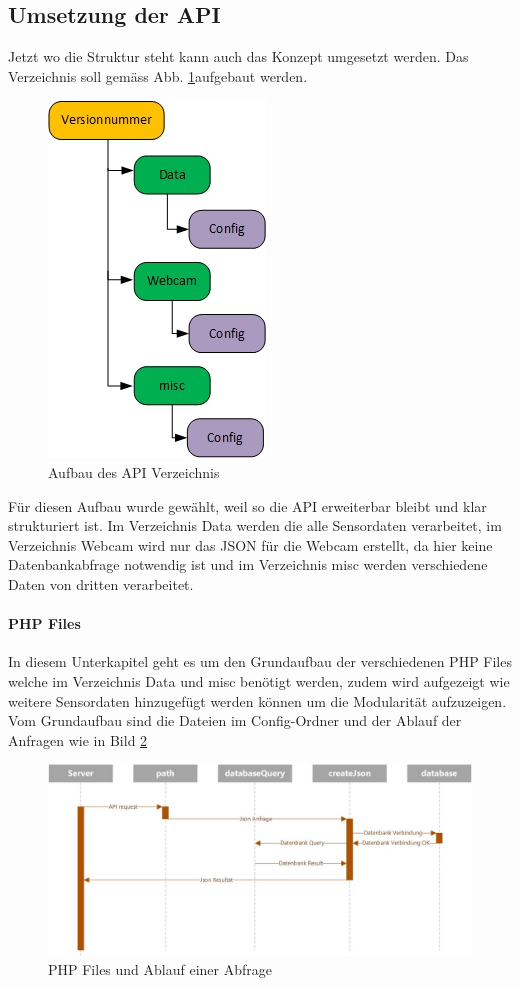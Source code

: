 \subsection{Umsetzung der API}
Jetzt wo die Struktur steht kann auch das Konzept umgesetzt werden. Das Verzeichnis soll gemäss Abb. \ref{img:APIVerzeichnis}aufgebaut werden.


\begin{figure}[h!]
	\centering
	\includegraphics[width=0.3\linewidth]{img/APIVerzeichnis.jpg}
	\caption{Aufbau des API Verzeichnis}
	\label{img:APIVerzeichnis}
\end{figure}

Für diesen Aufbau wurde gewählt, weil so die API erweiterbar bleibt und klar strukturiert ist. Im Verzeichnis Data werden die alle Sensordaten verarbeitet, im Verzeichnis Webcam wird nur das JSON für die Webcam erstellt, da hier keine Datenbankabfrage notwendig ist und im Verzeichnis misc werden verschiedene Daten von dritten verarbeitet.

\paragraph{PHP Files}
In diesem Unterkapitel geht es um den Grundaufbau der verschiedenen PHP Files welche im Verzeichnis Data und misc benötigt werden, zudem wird aufgezeigt wie weitere Sensordaten hinzugefügt werden können um die Modularität aufzuzeigen. Vom Grundaufbau sind die Dateien im Config-Ordner und der Ablauf der Anfragen wie in Bild \ref{img:APIFiles}
\begin{figure}[h!]
	\centering
	\includegraphics[width=0.5\linewidth]{img/APIFiles.jpg}
	\caption{PHP Files und Ablauf einer Abfrage}
	\label{img:APIFiles}
\end{figure}


